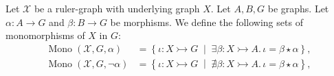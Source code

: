 
\begin{notation}
     Let \( \mathcal{X}\) be a ruler-graph with underlying graph $X$. Let \( A, B, G \) be graphs. Let \( \alpha \colon A \to G \) and \( \beta \colon B \to G \) be morphisms. 
    We define the following sets of monomorphisms of $X$ in $G$: 
    \begin{align*}
        \operatorname{Mono}(\mathcal{X},G,\alpha) &= \left\{ \iota \colon X \rightarrowtail G \;\middle|\; \exists \beta \colon X \rightarrowtail A.\, \iota = \beta \star \alpha \right\}, 
        \\
        \operatorname{Mono}(\mathcal{X},G,\lnot \alpha) &= \left\{ \iota \colon X \rightarrowtail G \;\middle|\; \nexists \beta \colon X \rightarrowtail A.\, \iota = \beta \star \alpha \right\}, 

\end{align*}
\end{notation}
